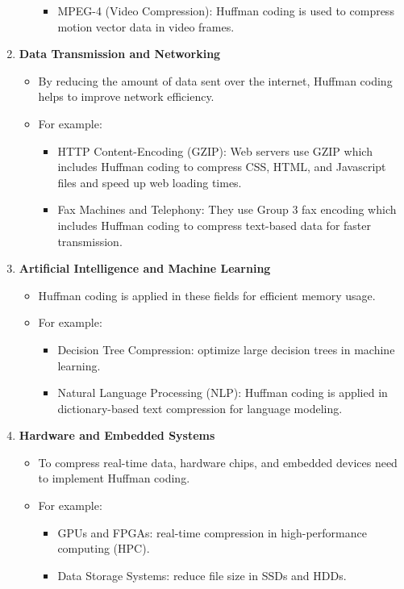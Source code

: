 \begin{enumerate}[label=\textbf{\Alph*.}]
\begin{itemize}
\begin{itemize}
            \item MPEG-4 (Video Compression): Huffman coding is used to compress motion vector data in video frames.
        \end{itemize}
    \end{itemize}
    \item \textbf{Data Transmission and Networking}
    \begin{itemize}
    \item By reducing the amount of data sent over the internet, Huffman coding helps to improve network efficiency.
    \item For example:
        \begin{itemize}
            \item HTTP Content-Encoding (GZIP): Web servers use GZIP which includes Huffman coding to compress CSS, HTML, and Javascript files and speed up web loading times.
            \item Fax Machines and Telephony: They use Group 3 fax encoding which includes Huffman coding to compress text-based data for faster transmission. 
        \end{itemize}
    \end{itemize}
    \item \textbf{Artificial Intelligence and Machine Learning}
    \begin{itemize}
    \item Huffman coding is applied in these fields for efficient memory usage.
    \item For example:
        \begin{itemize}
            \item Decision Tree Compression: optimize large decision trees in machine learning.
            \item Natural Language Processing (NLP): Huffman coding is applied in dictionary-based text compression for language modeling.
        \end{itemize}
    \end{itemize}
    \item \textbf{Hardware and Embedded Systems}
    \begin{itemize}
    \item To compress real-time data, hardware chips, and embedded devices need to implement Huffman coding.
    \item For example:
        \begin{itemize}
            \item GPUs and FPGAs: real-time compression in high-performance computing (HPC).
            \item Data Storage Systems: reduce file size in SSDs and HDDs.
        \end{itemize}
    \end{itemize}
\end{enumerate}